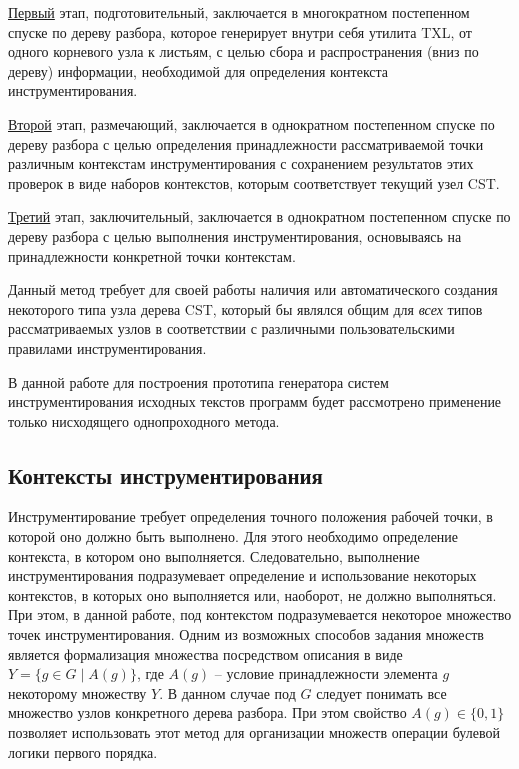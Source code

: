 \underline{Первый} этап, подготовительный, заключается в многократном постепенном спуске по дереву разбора, которое генерирует внутри себя утилита TXL, от одного корневого узла к листьям, с целью сбора и распространения (вниз по дереву) информации, необходимой для определения контекста инструментирования.

\underline{Второй} этап, размечающий, заключается в однократном постепенном спуске по дереву разбора с целью определения принадлежности рассматриваемой точки различным контекстам инструментирования с сохранением результатов этих проверок в виде наборов контекстов, которым соответствует текущий узел CST.

\underline{Третий} этап, заключительный, заключается в однократном постепенном спуске по дереву разбора с целью выполнения инструментирования, основываясь на принадлежности конкретной точки контекстам.

Данный метод требует для своей работы наличия или автоматического создания некоторого типа узла дерева CST, который бы являлся общим для \textit{всех} типов рассматриваемых узлов в соответствии с различными пользовательскими правилами инструментирования.

В данной работе для построения прототипа генератора систем инструментирования исходных текстов программ будет рассмотрено применение только нисходящего однопроходного метода.

\subsection{Контексты инструментирования}

Инструментирование требует определения точного положения рабочей точки, в которой оно должно быть выполнено.
Для этого необходимо определение контекста, в котором оно выполняется.
Следовательно, выполнение инструментирования подразумевает определение и использование некоторых контекстов, в которых оно выполняется или, наоборот, не должно выполняться.
При этом, в данной работе, под контекстом подразумевается некоторое множество точек инструментирования.
Одним из возможных способов задания множеств является формализация множества посредством описания в виде $Y = \{g \in G \mid A(g) \}$, где $A(g)$ -- условие принадлежности элемента $g$ некоторому множеству $Y$.
В данном случае под $G$ следует понимать все множество узлов конкретного дерева разбора.
При этом свойство $A(g) \in \{0, 1\}$ позволяет использовать этот метод для организации множеств операции булевой логики первого порядка.

